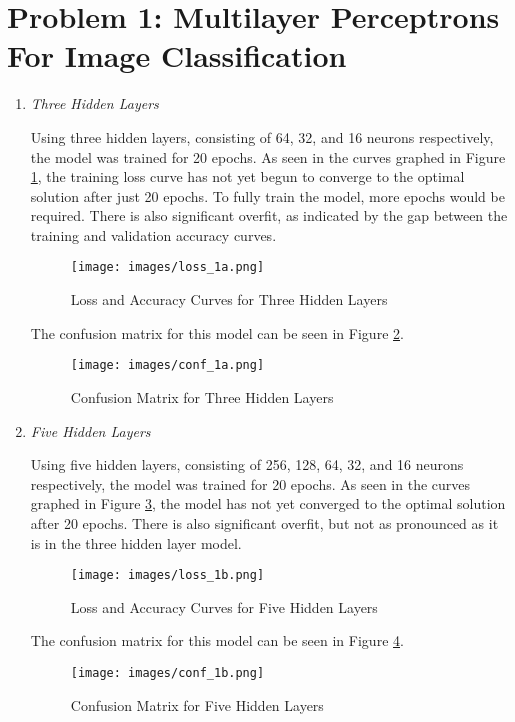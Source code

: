 \documentclass{article}
\begin{document}


\section{Problem 1: Multilayer Perceptrons For Image Classification}

\begin{enumerate}[label=1\alph*. ]
    \item \textit{Three Hidden Layers}
    
    Using three hidden layers, consisting of 64, 32, and 16
    neurons respectively, the model was trained for 20
    epochs. As seen in the curves graphed in Figure
    \ref{fig:loss_1a}, the training loss curve has not yet
    begun to converge to the optimal solution after just 20
    epochs. To fully train the model, more epochs would be
    required. There is also significant overfit, as
    indicated by the gap between the training and validation
    accuracy curves.
    
    \begin{figure}[h]
        \centering
        \texttt{[image: images/loss\_1a.png]}
        \caption{Loss and Accuracy Curves for Three Hidden Layers}
        \label{fig:loss_1a}
    \end{figure} 
    The confusion matrix for this model can be seen in
    Figure \ref{fig:confusion_1a}.
    \begin{figure}[h]
        \centering
        \texttt{[image: images/conf\_1a.png]}
        \caption{Confusion Matrix for Three Hidden Layers}
        \label{fig:confusion_1a}
    \end{figure} 

    \newpage
    \item \textit{Five Hidden Layers}
    
    Using five hidden layers, consisting of 256, 128, 64,
    32, and 16 neurons respectively, the model was trained
    for 20 epochs. As seen in the curves graphed in Figure
    \ref{fig:loss_1b}, the model has not yet converged to
    the optimal solution after 20 epochs. There is also
    significant overfit, but not as pronounced as it is in
    the three hidden layer model.
    \begin{figure}[h]
        \centering
        \texttt{[image: images/loss\_1b.png]}
        \caption{Loss and Accuracy Curves for Five Hidden Layers}
        \label{fig:loss_1b}
    \end{figure}
    The confusion matrix for this model can be seen in
    Figure \ref{fig:confusion_1b}.
    \begin{figure}[h]
        \centering
        \texttt{[image: images/conf\_1b.png]}
        \caption{Confusion Matrix for Five Hidden Layers}
        \label{fig:confusion_1b}
    \end{figure} 


\end{enumerate}
\end{document}
